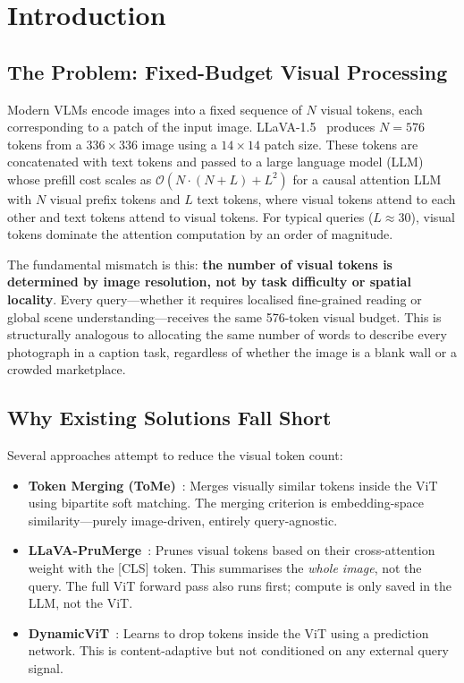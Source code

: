 \documentclass[12pt,a4paper]{article}
\begin{document}
\tableofcontents
\newpage

\section{Introduction}
\label{sec:intro}

\subsection{The Problem: Fixed-Budget Visual Processing}

Modern VLMs encode images into a fixed sequence of $N$ visual tokens, each
corresponding to a patch of the input image. LLaVA-1.5~\citep{liu2024llava}
produces $N = 576$ tokens from a $336 \times 336$ image using a $14 \times 14$
patch size. These tokens are concatenated with text tokens and passed to a large
language model (LLM) whose prefill cost scales as $\mathcal{O}(N \cdot (N + L)
+ L^2)$ for a causal attention LLM with $N$ visual prefix tokens and $L$ text
tokens, where visual tokens attend to each other and text tokens attend to visual
tokens. For typical queries ($L \approx 30$), visual tokens dominate the
attention computation by an order of magnitude.

The fundamental mismatch is this: \textbf{the number of visual tokens is
determined by image resolution, not by task difficulty or spatial locality}.
Every query---whether it requires localised fine-grained reading or global scene
understanding---receives the same 576-token visual budget. This is structurally
analogous to allocating the same number of words to describe every photograph in
a caption task, regardless of whether the image is a blank wall or a crowded
marketplace.

\subsection{Why Existing Solutions Fall Short}

Several approaches attempt to reduce the visual token count:

\begin{itemize}[leftmargin=2em]
  \item \textbf{Token Merging (ToMe)}~\citep{bolya2022token}: Merges visually
    similar tokens inside the ViT using bipartite soft matching. The merging
    criterion is embedding-space similarity---purely image-driven, entirely
    query-agnostic.
  \item \textbf{LLaVA-PruMerge}~\citep{shang2024llava}: Prunes visual tokens
    based on their cross-attention weight with the [CLS] token. This summarises
    the \emph{whole image}, not the query. The full ViT forward pass also runs
    first; compute is only saved in the LLM, not the ViT.
  \item \textbf{DynamicViT}~\citep{rao2021dynamicvit}: Learns to drop tokens
    inside the ViT using a prediction network. This is content-adaptive but not
    conditioned on any external query signal.
\end{itemize}
\end{document}

